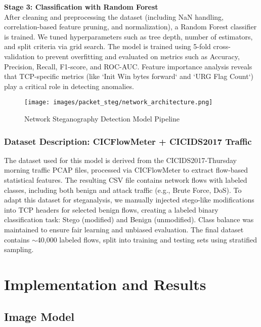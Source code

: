 \documentclass[12pt]{article}
\begin{document}
\vspace{0.2cm}

\textbf{Stage 3: Classification with Random Forest}\\
After cleaning and preprocessing the dataset (including NaN handling, correlation-based feature pruning, and normalization), a Random Forest classifier is trained. We tuned hyperparameters such as tree depth, number of estimators, and split criteria via grid search. The model is trained using 5-fold cross-validation to prevent overfitting and evaluated on metrics such as Accuracy, Precision, Recall, F1-score, and ROC-AUC. Feature importance analysis reveals that TCP-specific metrics (like `Init Win bytes forward` and `URG Flag Count`) play a critical role in detecting anomalies.

\begin{figure}[H]
    \centering
    \texttt{[image: images/packet\_steg/network\_architecture.png]}
    \caption{Network Steganography Detection Model Pipeline}
\end{figure}

\subsubsection{Dataset Description: CICFlowMeter + CICIDS2017 Traffic}
The dataset used for this model is derived from the CICIDS2017-Thursday morning traffic PCAP files, processed via CICFlowMeter to extract flow-based statistical features. The resulting CSV file contains network flows with labeled classes, including both benign and attack traffic (e.g., Brute Force, DoS). To adapt this dataset for steganalysis, we manually injected stego-like modifications into TCP headers for selected benign flows, creating a labeled binary classification task: Stego (modified) and Benign (unmodified). Class balance was maintained to ensure fair learning and unbiased evaluation. The final dataset contains $\sim$40,000 labeled flows, split into training and testing sets using stratified sampling.







\newpage
\section{Implementation and Results}

\subsection{Image Model }
\end{document}
